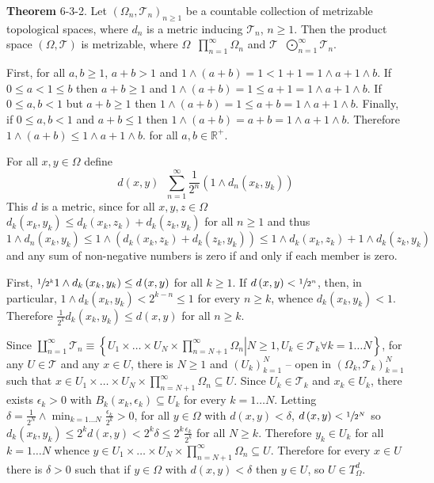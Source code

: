 \documentclass[a4paper]{article}
\newcommand{\obj}[1]{\left\{ #1 \right \}}
\newcommand{\brac}[1]{\left ( #1 \right )}
\newcommand{\induc}[1]{\left . #1 \right \vert}
\newcommand{\Real}{\mathbb{R}}
\newcommand{\Tcal}{\mathcal{T}}
\newcommand{\defn}{\mathop{\overset{\Delta}{=}}\nolimits}
\begin{document}
\label{thm:count_prod_space_metr} \noindent \textbf{Theorem} 6-3-2.
Let $\brac{\Omega_n, \Tcal_n}_{n\geq 1}$ be a countable collection of metrizable topological spaces, where $d_n$ is a metric inducing $\Tcal_n$, $n\geq 1$. Then the product space $\brac{\Omega, \Tcal}$ is metrizable, where $\Omega\defn \prod_{n = 1}^\infty \Omega_n$ and $\Tcal\defn \bigodot_{n=1}^\infty \Tcal_n$.%

First, for all $a,b\geq1$, $a+b>1$ and $1\wedge \brac{a+b} = 1 < 1 + 1 = 1\wedge a + 1\wedge b$. If $0\leq a<1\leq b$ then $a+b\geq 1$ and $1\wedge \brac{a+b} = 1 \leq a + 1 = 1\wedge a + 1\wedge b$. If $0\leq a,b<1$ but $a+b\geq1$ then $1\wedge \brac{a+b} = 1 \leq a + b = 1\wedge a + 1\wedge b$. Finally, if $0\leq a,b<1$ and $a+b\leq1$ then $1\wedge \brac{a+b} = a + b = 1\wedge a + 1\wedge b$. Therefore $1\wedge \brac{a+b} \leq 1\wedge a + 1\wedge b$. for all $a,b\in \Real^+$.

For all $x,y\in \Omega$ define \[d\brac{x, y}\defn \sum_{n=1}^\infty \frac{1}{2^n} \brac{ 1\wedge d_n\brac{x_k, y_k} }\] This $d$ is a metric, since for all $x,y,z\in \Omega$ $d_k\brac{x_k, y_k}\leq d_k\brac{x_k, z_k} + d_k\brac{z_k, y_k}$ for all $n\geq 1$ and thus \[1\wedge d_n\brac{x_k, y_k} \leq 1\wedge \brac{d_k\brac{x_k, z_k} + d_k\brac{z_k, y_k}}\leq 1 \wedge d_k\brac{x_k, z_k} + 1 \wedge d_k\brac{z_k, y_k}\] and any sum of non-negative numbers is zero if and only if each member is zero.

First, $\sfrac{1}{2^k} 1\wedge d_k\brac{x_k,y_k} \leq d\brac{x,y}$ for all $k\geq 1$. If $d\brac{x, y}<\sfrac{1}{2^n}$, then, in particular, $1\wedge d_k\brac{x_k,y_k} < 2^{k-n} \leq 1$ for every $n\geq k$, whence $d_k\brac{x_k,y_k} < 1$. Therefore $\frac{1}{2^k}d_k\brac{x_k,y_k} \leq d\brac{x, y}$ for all $n\geq k$.

Since $\coprod_{n=1}^\infty \Tcal_n \equiv \obj{ \induc{U_1\times\ldots \times U_N \times \prod_{n=N+1}^\infty \Omega_n } N\geq 1, U_k\in \Tcal_k \forall k=1\ldots N }$, for any $U\in \Tcal$ and any $x\in U$, there is $N\geq 1$ and $\brac{U_k}_{k=1}^N$ -- open in $\brac{\Omega_k, \Tcal_k}_{k=1}^N$ such that $x\in U_1\times\ldots \times U_N \times \prod_{n=N+1}^\infty \Omega_n\subseteq U$. Since $U_k\in \Tcal_k$ and $x_k\in U_k$, there exists $\epsilon_k>0$ with $B_k\brac{x_k, \epsilon_k} \subseteq U_k$ for every $k=1\ldots N$. Letting $\delta = \frac{1}{2^N} \wedge \min_{k=1\ldots N} \frac{\epsilon_k}{2^k} > 0$, for all $y\in \Omega$ with $d\brac{x, y} < \delta$, $d\brac{x, y}<\sfrac{1}{2^N}$ so $d_k\brac{x_k,y_k} \leq 2^k d\brac{x, y}< 2^k \delta\leq 2^k \frac{\epsilon_k}{2^k}$ for all $N \geq k$. Therefore $y_k\in U_k$ for all $k=1 \ldots N$ whence $y\in U_1\times\ldots \times U_N \times \prod_{n=N+1}^\infty \Omega_n\subseteq U$. Therefore for every $x\in U$ there is $\delta>0$ such that if $y\in \Omega$ with $d\brac{x, y}<\delta$ then $y\in U$, so $U\in T_\Omega^d$.
\end{document}
